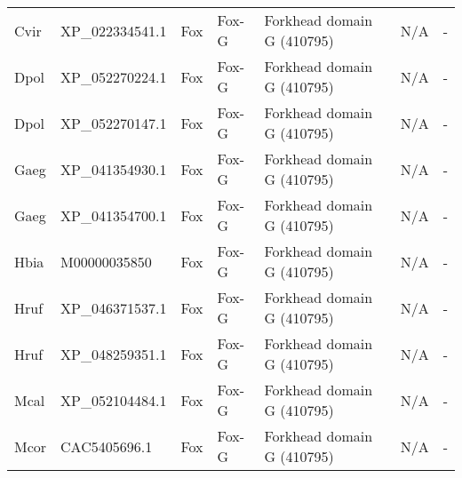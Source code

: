 \documentclass[../main.tex]{subfiles}
\begin{document}
\begin{landscape}
\begin{longtable}{lllllll}
		Cvir           & XP\_022334541.1       & Fox            & Fox-G               & Forkhead domain G (410795)                  & N/A                                                                    & -                    \\
		Dpol           & XP\_052270224.1       & Fox            & Fox-G               & Forkhead domain G (410795)                  & N/A                                                                    & -                    \\
		Dpol           & XP\_052270147.1       & Fox            & Fox-G               & Forkhead domain G (410795)                  & N/A                                                                    & -                    \\
		Gaeg           & XP\_041354930.1       & Fox            & Fox-G               & Forkhead domain G (410795)                  & N/A                                                                    & -                    \\
		Gaeg           & XP\_041354700.1       & Fox            & Fox-G               & Forkhead domain G (410795)                  & N/A                                                                    & -                    \\
		Hbia           & M00000035850          & Fox            & Fox-G               & Forkhead domain G (410795)                  & N/A                                                                    & -                    \\
		Hruf           & XP\_046371537.1       & Fox            & Fox-G               & Forkhead domain G (410795)                  & N/A                                                                    & -                    \\
		Hruf           & XP\_048259351.1       & Fox            & Fox-G               & Forkhead domain G (410795)                  & N/A                                                                    & -                    \\
		Mcal           & XP\_052104484.1       & Fox            & Fox-G               & Forkhead domain G (410795)                  & N/A                                                                    & -                    \\
		Mcor           & CAC5405696.1          & Fox            & Fox-G               & Forkhead domain G (410795)                  & N/A                                                                    & -                    \\

\end{longtable}
\end{landscape}
\end{document}
